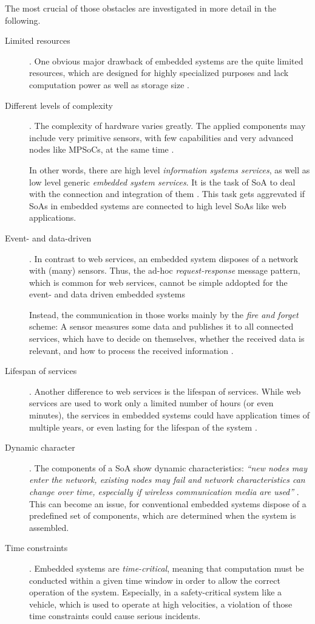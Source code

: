 The most crucial of those obstacles are investigated in more detail in the following.

\begin{description}
\item [Limited resources].
One obvious major drawback of embedded systems are the quite limited resources, which are designed for highly specialized purposes and lack computation power as well as storage size \cite{rodrigues2011} \cite{scholz} \cite{sommer}.

\item [Different levels of complexity].
The complexity of hardware varies greatly. The applied components may include very primitive sensors, with few capabilities and very advanced nodes like MPSoCs, at the same time \cite{scholz} \cite{sommer}.

In other words, there are high level \emph{information systems services}, as well as low level generic \emph{embedded system services}. It is the task of SoA to deal with the connection and integration of them \cite{rodrigues2011}. This task gets aggrevated if SoAs in embedded systems are connected to high level SoAs like web applications.

\item [Event- and data-driven].
In contrast to web services, an embedded system disposes of a network with (many) sensors. Thus, the ad-hoc \emph{request-response} message pattern, which is common for web services, cannot be simple addopted for the event- and data driven embedded systems \cite{sommer}

Instead, the communication in those works mainly by the \emph{fire and forget} scheme: A sensor measures some data and publishes it to all connected services, which have to decide on themselves, whether the received data is relevant, and how to process the received information \cite{sommer}.

\item [Lifespan of services].
Another difference to web services is the lifespan of services. While web services are used to work only a limited number of hours (or even minutes), the services in embedded systems could have application times of multiple years, or even lasting for the lifespan of the system \cite{buckl}.

\item [Dynamic character]. 
The components of a SoA show dynamic characteristics: \emph{``new nodes may enter the network, existing nodes may fail and network characteristics can change over time, especially if wireless communication media are used''} \cite{sommer}. This can become an issue, for conventional embedded systems dispose of a predefined set of components, which are determined when the system is assembled.

\item [Time constraints].
Embedded systems are \emph{time-critical}, meaning that computation must be conducted within a given time window in order to allow the correct operation of the system. Especially, in a safety-critical system like a vehicle, which is used to operate at high velocities, a violation of those time constraints could cause serious incidents.
\end{description}


